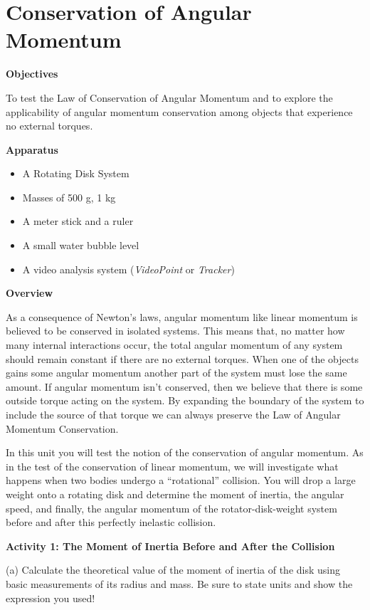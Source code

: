 
\section{Conservation of Angular Momentum}

\makelabheader %

\textbf{Objectives} 

To test the Law of Conservation of Angular Momentum and to explore the applicability
of angular momentum conservation among objects that experience no external torques. 

\textbf{Apparatus}

\begin{itemize}
\item A Rotating Disk System 
\item Masses of 500 g, 1 kg 
\item A meter stick and a ruler 
\item A small water bubble level
\item A video analysis system (\textit{VideoPoint} or \textit{Tracker})
\end{itemize}
\textbf{Overview }

As a consequence of Newton's laws, angular momentum like linear momentum is
believed to be conserved in isolated systems. This means that, no matter how
many internal interactions occur, the total angular momentum of any system should remain constant if there are no external torques. When one of the objects gains some angular momentum another part of the system must lose the same amount. If angular momentum isn't conserved, then we believe that there is some outside torque acting on the system. By expanding the boundary of the system to include the source of that torque we can always preserve the Law of Angular Momentum Conservation. 

In this unit you will test the notion of the conservation of angular momentum.
As in the test of the conservation of linear momentum, we will investigate what
happens when two bodies undergo a ``rotational'' collision.
You will drop a large weight onto a rotating disk and determine the moment of
inertia, the angular speed, and finally, the angular momentum of the rotator-disk-weight
system before and after this perfectly inelastic collision.

\textbf{Activity 1: The Moment of Inertia Before and After the Collision}

(a) Calculate the theoretical value of the moment of inertia of the disk
using basic measurements of its radius and mass. Be sure to state units and
show the expression you used!
\vspace{5mm}

